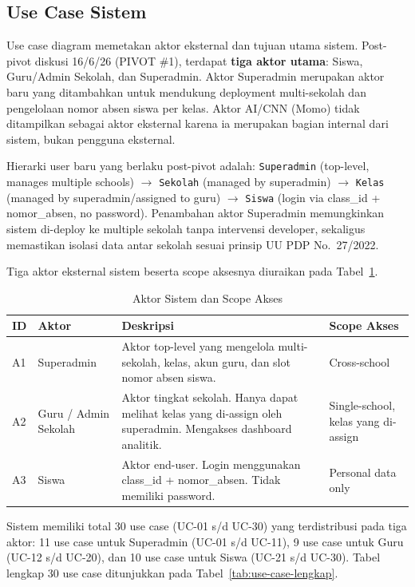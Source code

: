 \documentclass[12pt,a4paper,oneside,openany]{report}
\begin{document}
\subsection{Use Case Sistem}
\label{subsec:use-case}

Use case diagram memetakan aktor eksternal dan tujuan utama sistem. Post-pivot diskusi 16/6/26 (PIVOT \#1), terdapat \textbf{tiga aktor utama}: Siswa, Guru/Admin Sekolah, dan Superadmin. Aktor Superadmin merupakan aktor baru yang ditambahkan untuk mendukung deployment multi-sekolah dan pengelolaan nomor absen siswa per kelas. Aktor AI/CNN (Momo) tidak ditampilkan sebagai aktor eksternal karena ia merupakan bagian internal dari sistem, bukan pengguna eksternal.

Hierarki user baru yang berlaku post-pivot adalah: \texttt{Superadmin} (top-level, manages multiple schools) $\rightarrow$ \texttt{Sekolah} (managed by superadmin) $\rightarrow$ \texttt{Kelas} (managed by superadmin/assigned to guru) $\rightarrow$ \texttt{Siswa} (login via class\_id + nomor\_absen, no password). Penambahan aktor Superadmin memungkinkan sistem di-deploy ke multiple sekolah tanpa intervensi developer, sekaligus memastikan isolasi data antar sekolah sesuai prinsip UU PDP No.~27/2022.

Tiga aktor eksternal sistem beserta scope aksesnya diuraikan pada Tabel~\ref{tab:aktor-sistem}.

\begin{table}[H]
\centering
\caption{Aktor Sistem dan Scope Akses}
\label{tab:aktor-sistem}
\begin{tabular}{|p{1cm}|p{3.5cm}|p{6.5cm}|p{3cm}|}
\hline
\textbf{ID} & \textbf{Aktor} & \textbf{Deskripsi} & \textbf{Scope Akses} \\ \hline
A1 & Superadmin & Aktor top-level yang mengelola multi-sekolah, kelas, akun guru, dan slot nomor absen siswa. & Cross-school \\ \hline
A2 & Guru / Admin Sekolah & Aktor tingkat sekolah. Hanya dapat melihat kelas yang di-assign oleh superadmin. Mengakses dashboard analitik. & Single-school, kelas yang di-assign \\ \hline
A3 & Siswa & Aktor end-user. Login menggunakan class\_id + nomor\_absen. Tidak memiliki password. & Personal data only \\ \hline
\end{tabular}
\end{table}

Sistem memiliki total 30 use case (UC-01 s/d UC-30) yang terdistribusi pada tiga aktor: 11 use case untuk Superadmin (UC-01 s/d UC-11), 9 use case untuk Guru (UC-12 s/d UC-20), dan 10 use case untuk Siswa (UC-21 s/d UC-30). Tabel lengkap 30 use case ditunjukkan pada Tabel~\ref{tab:use-case-lengkap}.
\end{document}
